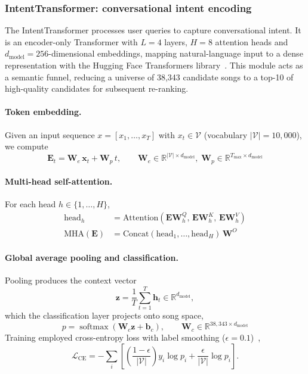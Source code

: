 \documentclass[]{ceurart}
\newcommand{\vect}[1]{\boldsymbol{#1}}
\newcommand{\mat}[1]{\mathbf{#1}}
\newcommand{\Real}{\mathbb{R}}
\newcommand{\softmax}{\operatorname{softmax}}
\begin{document}
\subsubsection{IntentTransformer: conversational intent encoding}
The IntentTransformer processes user queries to capture conversational intent.
It is an encoder-only Transformer with $L=4$ layers, $H=8$ attention heads and
$d_{\text{model}}=256$-dimensional embeddings, mapping natural-language input to
a dense representation with the Hugging Face Transformers
library~\cite{wolf2020transformers}. This module acts as a semantic funnel,
reducing a universe of 38,343 candidate songs to a top-10 of high-quality
candidates for subsequent re-ranking.

\paragraph{Token embedding.}
Given an input sequence $x = [x_1, \ldots, x_T]$ with $x_t \in \mathcal{V}$
(vocabulary $|\mathcal{V}| = 10{,}000$), we compute
\begin{equation}
\vect{E}_t = \mat{W}_e\,\vect{x}_t + \mat{W}_p\,t,
\qquad
\mat{W}_e \in \Real^{|\mathcal{V}|\times d_{\text{model}}},\;
\mat{W}_p \in \Real^{T_{\max}\times d_{\text{model}}}
\label{eq:embedding}
\end{equation}

\paragraph{Multi-head self-attention.}
For each head $h \in \{1,\ldots,H\}$,
\begin{align}
\text{head}_h &= \text{Attention}(\vect{E}\mat{W}_h^Q,\,
                  \vect{E}\mat{W}_h^K,\, \vect{E}\mat{W}_h^V)
                  \label{eq:head} \\
\text{MHA}(\vect{E}) &= \text{Concat}(\text{head}_1, \ldots, \text{head}_H)\,
                        \mat{W}^O \label{eq:mha}
\end{align}

\paragraph{Global average pooling and classification.}
Pooling produces the context vector
\begin{equation}
\vect{z} = \frac{1}{T}\sum_{t=1}^{T} \vect{h}_t \in \Real^{d_{\text{model}}},
\label{eq:pooling}
\end{equation}
which the classification layer projects onto song space,
\begin{equation}
p = \softmax(\mat{W}_c \vect{z} + \vect{b}_c),
\qquad \mat{W}_c \in \Real^{38{,}343 \times d_{\text{model}}}
\label{eq:classification}
\end{equation}
Training employed cross-entropy loss with label smoothing
($\epsilon = 0.1$)~\cite{mueller2019label},
\begin{equation}
\mathcal{L}_{\text{CE}} =
  -\sum_{i}\left[\left(\frac{1-\epsilon}{|\mathcal{V}|}\right) y_i \log p_i
  + \frac{\epsilon}{|\mathcal{V}|} \log p_i\right].
\label{eq:loss}
\end{equation}
\end{document}
